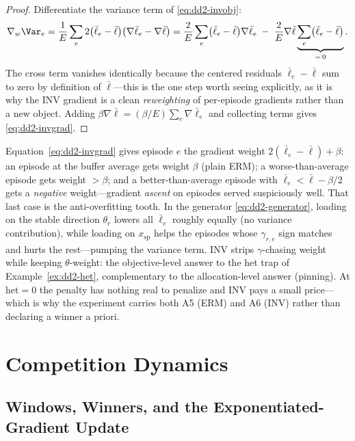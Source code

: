 \begin{proof}
Differentiate the variance term of \eqref{eq:dd2-invobj}:
\[
\nabla_w \Var_e
= \frac{1}{E} \sum_{e} 2\bigl(\bar\ell_e - \bar\ell\bigr)
\bigl(\nabla \bar\ell_e - \nabla \bar\ell\bigr)
= \frac{2}{E} \sum_{e} \bigl(\bar\ell_e - \bar\ell\bigr) \nabla \bar\ell_e
\;-\; \frac{2}{E} \nabla \bar\ell \underbrace{\sum_{e} \bigl(\bar\ell_e - \bar\ell\bigr)}_{=\,0}.
\]
The cross term vanishes identically because the centered residuals
$\bar\ell_e - \bar\ell$ sum to zero by definition of $\bar\ell$---this is the
one step worth seeing explicitly, as it is why the INV gradient is a clean
\emph{reweighting} of per-episode gradients rather than a new object. Adding
$\beta \nabla \bar\ell = (\beta/E) \sum_e \nabla \bar\ell_e$ and collecting
terms gives \eqref{eq:dd2-invgrad}.
\end{proof}

\begin{intuition}[title={Reading the INV weights}]
Equation~\eqref{eq:dd2-invgrad} gives episode $e$ the gradient weight
$2(\bar\ell_e - \bar\ell) + \beta$: an episode at the buffer average gets
weight $\beta$ (plain ERM); a worse-than-average episode gets weight
$> \beta$; and a better-than-average episode with
$\bar\ell_e < \bar\ell - \beta/2$ gets a \emph{negative} weight---gradient
\emph{ascent} on episodes served suspiciously well. That last case is the
anti-overfitting tooth. In the generator \eqref{eq:dd2-generator}, loading
on the stable direction $\theta_r$ lowers all $\bar\ell_e$ roughly equally
(no variance contribution), while loading on $x_{\mathrm{sp}}$ helps the
episodes whose $\gamma_{r,e}$ sign matches and hurts the rest---pumping the
variance term. INV strips $\gamma$-chasing weight while keeping
$\theta$-weight: the objective-level answer to the het trap of
Example~\ref{ex:dd2-het}, complementary to the allocation-level answer
(pinning). At $\mathrm{het} = 0$ the penalty has nothing real to penalize
and INV pays a small price---which is why the experiment carries both A5
(ERM) and A6 (INV) rather than declaring a winner a priori.
\end{intuition}

\section{Competition Dynamics}
\label{sec:dd2-competition}

\subsection{Windows, Winners, and the Exponentiated-Gradient Update}

